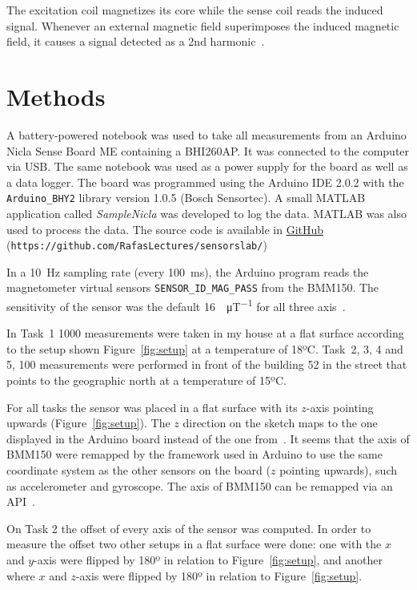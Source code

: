 \documentclass[DIV=14]{scrartcl}
\begin{document}
    The excitation coil magnetizes its core while the sense coil reads the induced signal.
    Whenever an external magnetic field superimposes the induced magnetic field, it causes a signal detected as
    a 2nd harmonic~\cite{labManual}.



    \section{Methods}\label{sec:methods}
    A battery-powered notebook was used to take all measurements from an Arduino Nicla Sense Board ME containing a BHI260AP.
    It was connected to the computer via USB.
    The same notebook was used as a power supply for the board as well as a data logger.
    The board was programmed using the Arduino IDE 2.0.2 with the \texttt{Arduino\_BHY2} library version 1.0.5 (Bosch Sensortec).
    A small MATLAB application called \textit{SampleNicla} was developed to log the data.
    MATLAB was also used to process the data.
    The source code is available in \href{https://github.com/RafasLectures/sensorslab/blob/main/SampleNicla.mlapp}{GitHub}
    (\texttt{https://github.com/RafasLectures/sensorslab/})

    In a \SI{10}{\hertz} sampling rate (every \SI{100}{\milli\second}), the Arduino program reads the magnetometer
    virtual sensors \texttt{SENSOR\_ID\_MAG\_PASS} from the BMM150.
    The sensitivity of the sensor was the default \SI{16}{\LSB\per\micro\tesla} for all three axis~\cite{BMM150}.

    In Task~1 1000 measurements were taken in my house at a flat surface according to the setup shown Figure~\ref{fig:setup}
    at a temperature of 18ºC.
    Task~2, 3, 4 and 5, 100 measurements were performed in front of the building 52 in the street that
    points to the geographic north at a temperature of 15ºC.

    For all tasks the sensor was placed in a flat surface with its $z$-axis pointing upwards (Figure~\ref{fig:setup}).
    The $z$ direction on the sketch maps to the one displayed in the Arduino board instead of the one from~\cite{BMM150}.
    It seems that the axis of BMM150 were remapped by the framework used in Arduino to use the same coordinate system
    as the other sensors on the board ($z$ pointing upwards), such as accelerometer and gyroscope.
    The axis of BMM150 can be remapped via an API~\cite{BMM150}.

    On Task 2 the offset of every axis of the sensor was computed.
    In order to measure the offset two other setups in a flat surface were done:
    one with the $x$ and $y$-axis were flipped by 180º in relation to Figure~\ref{fig:setup}, and
    another where $x$ and $z$-axis were flipped by 180º in relation to Figure~\ref{fig:setup}.
\end{document}
